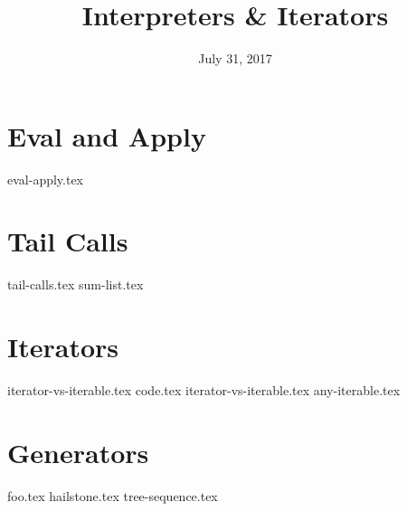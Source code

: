 \documentclass{exam}
\title{Interpreters \& Iterators}
\date{July 31, 2017}
\begin{document}
\maketitle

\section{Eval and Apply}
\begin{questions}
{eval-apply.tex}
\end{questions}

\section{Tail Calls}
\begin{questions}
{tail-calls.tex}
{sum-list.tex}
\end{questions}

\clearpage

\lstset{language=Python}
\section{Iterators}
\begin{questions}
{iterator-vs-iterable.tex}
{code.tex}
{iterator-vs-iterable.tex}
{any-iterable.tex}
\end{questions}

\section{Generators}
\begin{questions}
{foo.tex}
\clearpage
{hailstone.tex}
{tree-sequence.tex}
\end{questions}
\end{document}
